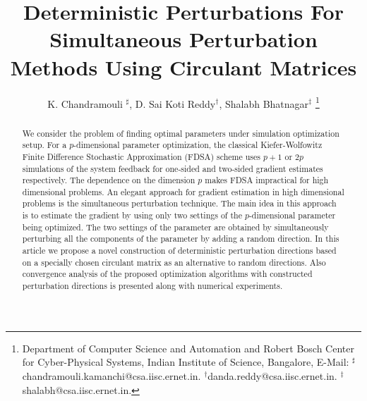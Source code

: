 \documentclass[letterpaper, 10 pt, conference]{ieeeconf}  %
\title{\LARGE \bf
 Deterministic Perturbations For Simultaneous Perturbation Methods Using
 Circulant Matrices
}
\author{K. Chandramouli $^\sharp$, D. Sai Koti Reddy$^\dagger$, Shalabh Bhatnagar$^\ddag$
\thanks{
Department of Computer Science and Automation and 
Robert Bosch Center for Cyber-Physical Systems,
Indian Institute of Science, Bangalore, 
E-Mail: $^\sharp$chandramouli.kamanchi@csa.iisc.ernet.in.
$^\dagger$danda.reddy@csa.iisc.ernet.in.
$^\ddag$shalabh@csa.iisc.ernet.in.}
}
\begin{document}
% 
% 
\maketitle
% 
% 
\begin{abstract}
We consider the problem of finding optimal parameters under simulation optimization setup.
For a $p$-dimensional parameter optimization, the classical Kiefer-Wolfowitz Finite Difference Stochastic 
Approximation (FDSA) scheme uses $p+1$ or $2p$ simulations of the system feedback for one-sided 
and two-sided gradient estimates respectively.
The dependence on the dimension $p$ makes FDSA impractical for high dimensional problems.
An elegant approach for gradient estimation in high dimensional problems is the 
simultaneous perturbation technique.
The main idea in this approach is to estimate the gradient by using only two settings of 
the $p$-dimensional parameter being optimized. 
The two settings of the parameter are obtained by
simultaneously perturbing all the components of the parameter by adding a random 
direction. In this article we propose a novel construction of deterministic perturbation directions 
based on a specially chosen circulant matrix as an alternative to random directions. Also convergence 
analysis of the proposed optimization algorithms with constructed perturbation directions is presented 
along with numerical experiments.



\end{abstract}
\end{document}
